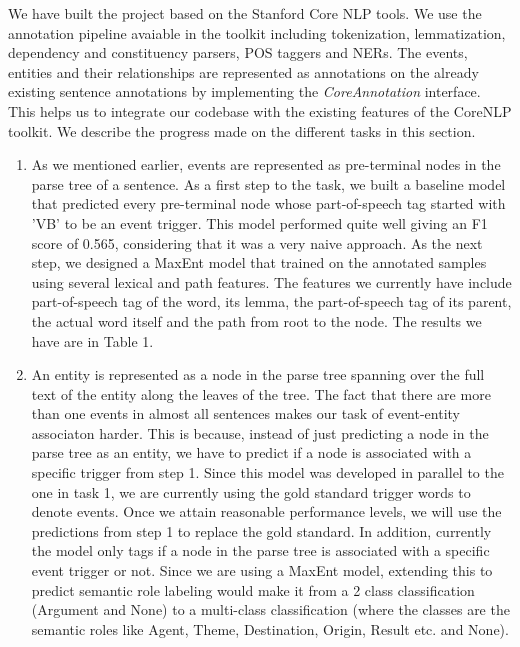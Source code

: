 We have built the project based on the Stanford Core NLP tools. We use the annotation pipeline avaiable in the toolkit including tokenization, lemmatization, dependency and constituency parsers, POS taggers and NERs. The events, entities and their relationships are represented as annotations on the already existing sentence annotations by implementing the {\em CoreAnnotation} interface. This helps us to integrate our codebase with the existing features of the CoreNLP toolkit. We describe the progress made on the different tasks in this section.

\begin{enumerate}

\item {} As we mentioned earlier, events are represented as pre-terminal nodes in the parse tree of a sentence. As a first step to the task, we built a baseline model that predicted every pre-terminal node whose part-of-speech tag started with 'VB' to be an event trigger. This model performed quite well giving an F1 score of 0.565, considering that it was a very naive approach. As the next step, we designed a MaxEnt model that trained on the annotated samples using several lexical and path features. The features we currently have include part-of-speech tag of the word, its lemma, the part-of-speech tag of its parent, the actual word itself and the path from root to the node. The results we have are in Table 1.

\item {} An entity is represented as a node in the parse tree spanning over the full text of the entity along the leaves of the tree. The fact that there are more than one events in almost all sentences makes our task of event-entity associaton harder. This is because, instead of just predicting a node in the parse tree as an entity, we have to predict if a node is associated with a specific trigger from step 1. Since this model was developed in parallel to the one in task 1, we are currently using the gold standard trigger words to denote events. Once we attain reasonable performance levels, we will use the predictions from step 1 to replace the gold standard. In addition, currently the model only tags if a node in the parse tree is associated with a specific event trigger or not. Since we are using a MaxEnt model, extending this to predict semantic role labeling would make it from a 2 class classification (Argument and None) to a multi-class classification (where the classes are the semantic roles like Agent, Theme, Destination, Origin, Result etc. and None).


\end{enumerate}
